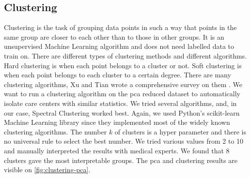 \subsection{Clustering}

Clustering is the task of grouping data points in such a way that points in the same group are closer to each other than to those in other groups. It is an unsupervised Machine Learning algorithm and does not need labelled data to train on. There are different types of clustering methods and different algorithms. Hard clustering is when each point belongs to a cluster or not. Soft clustering is when each point belongs to each cluster to a certain degree. There are many clustering algorithms, Xu and Tian wrote a comprehensive survey on them \cite{xu_comprehensive_2015}. We want to run a clustering algorithm on the \ac{pca} reduced dataset to automatically isolate care centers with similar statistics. We tried several algorithms, and, in our case, Spectral Clustering \cite{luxburg_tutorial_2007} worked best. Again, we used Python's scikit-learn Machine Learning library \cite{pedregosa_scikit-learn_2011} since they implemented most of the widely known clustering algorithms. The number $k$ of clusters is a hyper parameter and there is no universal rule to select the best number. We tried various values from 2 to 10 and manually interpreted the results with medical experts. We found that 8 clusters gave the most interpretable groups. The \ac{pca} and clustering results are visible on \cref{fig:clustering-pca}.

